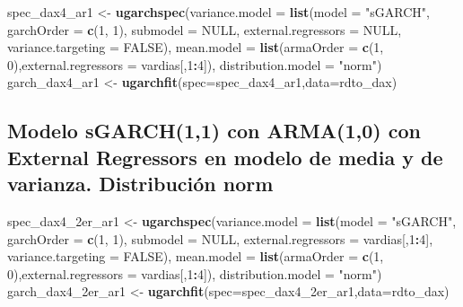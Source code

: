 \documentclass[
  11pt,
]{article}
\newenvironment{Shaded}{\begin{snugshade}}{\end{snugshade}}
\newcommand{\DataTypeTok}[1]{\textcolor[rgb]{0.13,0.29,0.53}{#1}}
\newcommand{\DecValTok}[1]{\textcolor[rgb]{0.00,0.00,0.81}{#1}}
\newcommand{\KeywordTok}[1]{\textcolor[rgb]{0.13,0.29,0.53}{\textbf{#1}}}
\newcommand{\NormalTok}[1]{#1}
\newcommand{\OperatorTok}[1]{\textcolor[rgb]{0.81,0.36,0.00}{\textbf{#1}}}
\newcommand{\OtherTok}[1]{\textcolor[rgb]{0.56,0.35,0.01}{#1}}
\newcommand{\StringTok}[1]{\textcolor[rgb]{0.31,0.60,0.02}{#1}}
\begin{document}
\begin{Shaded}
\begin{Highlighting}[]
\NormalTok{spec_dax4_ar1 <-}\StringTok{ }\KeywordTok{ugarchspec}\NormalTok{(}\DataTypeTok{variance.model =} \KeywordTok{list}\NormalTok{(}\DataTypeTok{model =} \StringTok{"sGARCH"}\NormalTok{, }\DataTypeTok{garchOrder =} \KeywordTok{c}\NormalTok{(}\DecValTok{1}\NormalTok{, }\DecValTok{1}\NormalTok{), }
                    \DataTypeTok{submodel =} \OtherTok{NULL}\NormalTok{, }\DataTypeTok{external.regressors =} \OtherTok{NULL}\NormalTok{, }\DataTypeTok{variance.targeting =} \OtherTok{FALSE}\NormalTok{), }
                    \DataTypeTok{mean.model =} \KeywordTok{list}\NormalTok{(}\DataTypeTok{armaOrder =} \KeywordTok{c}\NormalTok{(}\DecValTok{1}\NormalTok{, }\DecValTok{0}\NormalTok{),}\DataTypeTok{external.regressors =}\NormalTok{ vardias[,}\DecValTok{1}\OperatorTok{:}\DecValTok{4}\NormalTok{]),}
               \DataTypeTok{distribution.model =} \StringTok{"norm"}\NormalTok{)}
\NormalTok{garch_dax4_ar1 <-}\StringTok{ }\KeywordTok{ugarchfit}\NormalTok{(}\DataTypeTok{spec=}\NormalTok{spec_dax4_ar1,}\DataTypeTok{data=}\NormalTok{rdto_dax)}
\end{Highlighting}
\end{Shaded}

\hypertarget{modelo-sgarch11-con-arma10-con-external-regressors-en-modelo-de-media-y-de-varianza.-distribuciuxf3n-norm}{%
\subsection{Modelo sGARCH(1,1) con ARMA(1,0) con External Regressors en
modelo de media y de varianza. Distribución
norm}\label{modelo-sgarch11-con-arma10-con-external-regressors-en-modelo-de-media-y-de-varianza.-distribuciuxf3n-norm}}

\begin{Shaded}
\begin{Highlighting}[]
\NormalTok{spec_dax4_2er_ar1 <-}\StringTok{ }\KeywordTok{ugarchspec}\NormalTok{(}\DataTypeTok{variance.model =} \KeywordTok{list}\NormalTok{(}\DataTypeTok{model =} \StringTok{"sGARCH"}\NormalTok{, }\DataTypeTok{garchOrder =} \KeywordTok{c}\NormalTok{(}\DecValTok{1}\NormalTok{, }\DecValTok{1}\NormalTok{), }
                    \DataTypeTok{submodel =} \OtherTok{NULL}\NormalTok{, }\DataTypeTok{external.regressors =}\NormalTok{ vardias[,}\DecValTok{1}\OperatorTok{:}\DecValTok{4}\NormalTok{], }\DataTypeTok{variance.targeting =} \OtherTok{FALSE}\NormalTok{), }
                    \DataTypeTok{mean.model =} \KeywordTok{list}\NormalTok{(}\DataTypeTok{armaOrder =} \KeywordTok{c}\NormalTok{(}\DecValTok{1}\NormalTok{, }\DecValTok{0}\NormalTok{),}\DataTypeTok{external.regressors =}\NormalTok{ vardias[,}\DecValTok{1}\OperatorTok{:}\DecValTok{4}\NormalTok{]),}
               \DataTypeTok{distribution.model =} \StringTok{"norm"}\NormalTok{)}
\NormalTok{garch_dax4_2er_ar1 <-}\StringTok{ }\KeywordTok{ugarchfit}\NormalTok{(}\DataTypeTok{spec=}\NormalTok{spec_dax4_2er_ar1,}\DataTypeTok{data=}\NormalTok{rdto_dax)}
\end{Highlighting}
\end{Shaded}
\end{document}
